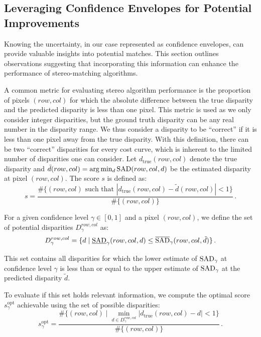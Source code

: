 \subsection{Leveraging Confidence Envelopes for Potential Improvements}\label{sec:sad_improvements}

Knowing the uncertainty, in our case represented as confidence envelopes, can provide valuable insights into potential matches. This section outlines observations suggesting that incorporating this information can enhance the performance of stereo-matching algorithms.

A common metric for evaluating stereo algorithm performance is the proportion of pixels $(row, col)$ for which the absolute difference between the true disparity and the predicted disparity is less than one pixel. This metric is used as we only consider integer disparities, but the ground truth disparity can be any real number in the disparity range. We thus consider a disparity to be ``correct'' if it is less than one pixel away from the true disparity. With this definition, there can be two ``correct'' disparities for every cost curve, which is inherent to the limited number of disparities one can consider. Let $d_{\mathrm{true}}(row, col)$ denote the true disparity and $\tilde{d}(row, col) = \arg \min_d {\mathrm{SAD}}(row, col, d)$ be the estimated disparity at pixel $(row, col)$. The score \( s \) is defined as:
\begin{equation}
    s = \frac{\#\{(row, col) \text{ such that } |d_{\mathrm{true}}(row, col) - \tilde{d}(row, col)| < 1\}}{\#\{(row, col)\}}\,.
\end{equation}

For a given confidence level $\gamma \in [0, 1]$ and a pixel $(row, col)$, we define the set of potential disparities $D_\gamma^{row, col}$ as:
\begin{equation}
    D_\gamma^{row, col} = \{d \mid \underline{{\mathrm{SAD}}}_\gamma(row, col, d) \leq \overline{{\mathrm{SAD}}}_\gamma(row, col, \tilde{d})\}\,.
\end{equation}

This set contains all disparities for which the lower estimate of ${\mathrm{SAD}}_\gamma$ at confidence level $\gamma$ is less than or equal to the upper estimate of ${\mathrm{SAD}}_\gamma$ at the predicted disparity $\tilde{d}$.

To evaluate if this set holds relevant information, we compute the optimal score \( s_\gamma^{\text{opt}} \) achievable using the set of possible disparities:
\begin{equation}
    s_\gamma^{\text{opt}} = \frac{\#\{(row, col) \mid \min_{d \in D_\gamma^{row, col}} |d_{\mathrm{true}}(row, col) - d| < 1\}}{\#\{(row, col)\}}\,.
\end{equation}

